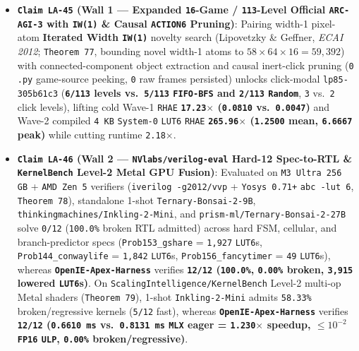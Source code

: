 \documentclass[10pt]{article}
\begin{document}
\begin{itemize}
  \item \textbf{\texttt{Claim LA-45} (Wall 1 --- Expanded \texttt{16}-Game / \texttt{113}-Level Official \texttt{ARC-AGI-3} with \texttt{IW(1)} \& Causal \texttt{ACTION6} Pruning)}: Pairing width-1 pixel-atom \textbf{Iterated Width \texttt{IW(1)}} novelty search (Lipovetzky \& Geffner, \emph{ECAI 2012}; \texttt{Theorem 77}, bounding novel width-1 atoms to $58 \times 64 \times 16 = 59{,}392$) with connected-component object extraction and causal inert-click pruning (\texttt{0} \texttt{.py} game-source peeking, \texttt{0} raw frames persisted) unlocks click-modal \texttt{lp85-305b61c3} (\textbf{\texttt{6/113} levels vs.\ \texttt{5/113} \texttt{FIFO-BFS} and \texttt{2/113} \texttt{Random}}, \texttt{3} vs.\ \texttt{2} click levels), lifting cold Wave-1 \texttt{RHAE} \textbf{\texttt{17.23$\times$} (\texttt{0.0810} vs.\ \texttt{0.0047})} and Wave-2 compiled \texttt{4 KB} \texttt{System-0} \texttt{LUT6} \texttt{RHAE} \textbf{\texttt{265.96$\times$} (\texttt{1.2500} mean, \texttt{6.6667} peak)} while cutting runtime \texttt{2.18$\times$}.
  \item \textbf{\texttt{Claim LA-46} (Wall 2 --- \texttt{NVlabs/verilog-eval} Hard-12 Spec-to-RTL \& \texttt{KernelBench} Level-2 Metal GPU Fusion)}: Evaluated on \texttt{M3 Ultra 256 GB} + \texttt{AMD Zen 5} verifiers (\texttt{iverilog -g2012/vvp} + \texttt{Yosys 0.71+} \texttt{abc -lut 6}, \texttt{Theorem 78}), standalone 1-shot \texttt{Ternary-Bonsai-2-9B}, \texttt{thinkingmachines/Inkling-2-Mini}, and \texttt{prism-ml/Ternary-Bonsai-2-27B} solve \texttt{0/12} (\texttt{100.0\%} broken RTL admitted) across hard FSM, cellular, and branch-predictor specs (\texttt{Prob153\_gshare} = \texttt{1,927} \texttt{LUT6}s, \texttt{Prob144\_conwaylife} = \texttt{1,842} \texttt{LUT6}s, \texttt{Prob156\_fancytimer} = \texttt{49} \texttt{LUT6}s), whereas \textbf{\texttt{OpenIE-Apex-Harness}} verifies \textbf{\texttt{12/12} (\texttt{100.0\%}, \texttt{0.00\%} broken, \texttt{3,915} lowered \texttt{LUT6}s)}. On \texttt{ScalingIntelligence/KernelBench} Level-2 multi-op Metal shaders (\texttt{Theorem 79}), 1-shot \texttt{Inkling-2-Mini} admits \texttt{58.33\%} broken/regressive kernels (\texttt{5/12} fast), whereas \textbf{\texttt{OpenIE-Apex-Harness}} verifies \textbf{\texttt{12/12} (\texttt{0.6610 ms} vs.\ \texttt{0.8131 ms} \texttt{MLX} eager = \texttt{1.230$\times$} speedup, \texttt{$\le 10^{-2}$} \texttt{FP16} \texttt{ULP}, \texttt{0.00\%} broken/regressive)}.

\end{itemize}
\end{document}
